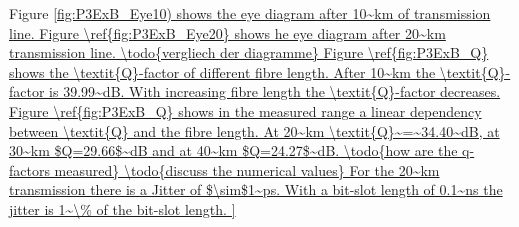 Figure \ref{fig:P3ExB_Eye10) shows the eye diagram after 10~km of transmission line. Figure \ref{fig:P3ExB_Eye20} shows he eye diagram after 20~km transmission line.
\todo{vergliech der diagramme}

Figure \ref{fig:P3ExB_Q} shows the \textit{Q}-factor of different fibre length. After 10~km the \textit{Q}-factor is 39.99~dB. With increasing fibre length the \textit{Q}-factor decreases. Figure \ref{fig:P3ExB_Q} shows in the measured range a linear dependency between \textit{Q} and the fibre length. At 20~km \textit{Q}~=~34.40~dB, at 30~km $Q=29.66$~dB and at 40~km $Q=24.27$~dB.
\todo{how are the q-factors measured}
\todo{discuss the numerical values}
For the 20~km transmission there is a Jitter of $\sim$1~ps. With a bit-slot length of 0.1~ns the jitter is 1~\% of the bit-slot length.


}
